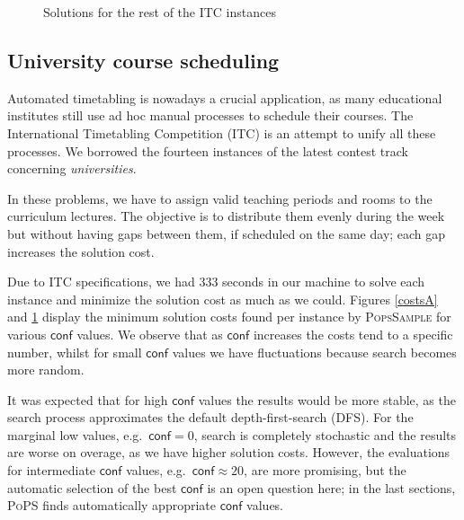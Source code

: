 \documentclass{ws-ijait}
\begin{document}
\begin{figure}
\centering

\caption{Solutions for the rest of the ITC instances\label{costsB}}
\end{figure}

\subsection{University course scheduling\label{ITC}}

Automated timetabling is nowadays a crucial application, as many educational institutes still use ad hoc manual processes to schedule their courses. The International Time\-ta\-bl\-in\-g Competition (ITC) is an attempt to unify all these processes. We borrowed the fourteen instances of the latest contest track concerning \emph{universities}.\cite{itc-agenda}

In these problems, we have to assign valid teaching periods and rooms to the curriculum lectures. The objective is to distribute them evenly during the week but without having gaps between them, if scheduled on the same day; each gap increases the solution cost.\cite{pothitos-ictai2012}

Due to ITC specifications, we had 333 seconds in our machine to solve each instance and minimize the solution cost as much as we could. Figures \ref{costsA} and \ref{costsB} display the minimum solution costs found per instance by \textsc{PopsSample} for various $\mathsf{conf}$ values. We observe that as $\mathsf{conf}$ increases the costs tend to a specific number, whilst for small $\mathsf{conf}$ values we have fluctuations because search becomes more random.


It was expected that for high $\mathsf{conf}$ values the results would be more stable, as the search process approximates the default depth-first-search (DFS). For the marginal low values, e.g.\ $\mathsf{conf} = 0$, search is completely stochastic and the results are worse on overage, as we have higher solution costs. However, the evaluations for intermediate $\mathsf{conf}$ values, e.g.\ $\mathsf{conf} \approx 20$, are more promising, but the automatic selection of the best $\mathsf{conf}$ is an open question here; in the last sections, \textsc{PoPS} finds automatically appropriate $\mathsf{conf}$ values.
\end{document}
